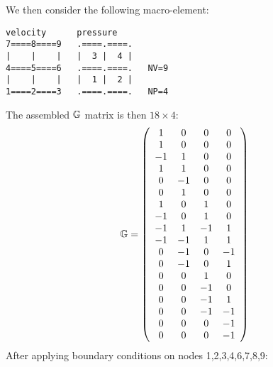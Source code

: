 We then consider the following macro-element:

\begin{verbatim}
velocity      pressure
7====8====9   .====.====.
|    |    |   |  3 |  4 |
4====5====6   .====.====.   NV=9
|    |    |   |  1 |  2 |   
1====2====3   .====.====.   NP=4
\end{verbatim}


The assembled ${\mathbb{G}}$ matrix is then $18 \times 4$:
\[
{\mathbb{G}} = 
\left(
\begin{array}{cccc}
  1  &   0 &   0 &   0  \\ 
  1  &   0 &   0 &   0  \\ 
 -1  &   1 &   0 &   0  \\ 
  1  &   1 &   0 &   0  \\ 
  0  &  -1 &   0 &   0  \\ 
  0  &   1 &   0 &   0  \\ 
  1  &   0 &   1 &   0  \\ 
 -1  &   0 &   1 &   0  \\ 
 -1  &   1 &  -1 &   1  \\ 
 -1  &  -1 &   1 &   1  \\ 
  0  &  -1 &   0 &  -1  \\ 
  0  &  -1 &   0 &   1  \\ 
  0  &   0 &   1 &   0  \\ 
  0  &   0 &  -1 &   0  \\ 
  0  &   0 &  -1 &   1  \\ 
  0  &   0 &  -1 &  -1  \\ 
  0  &   0 &   0 &  -1  \\ 
  0  &   0 &   0 &  -1  
\end{array}
\right)
\]
After applying boundary conditions on nodes 1,2,3,4,6,7,8,9:

